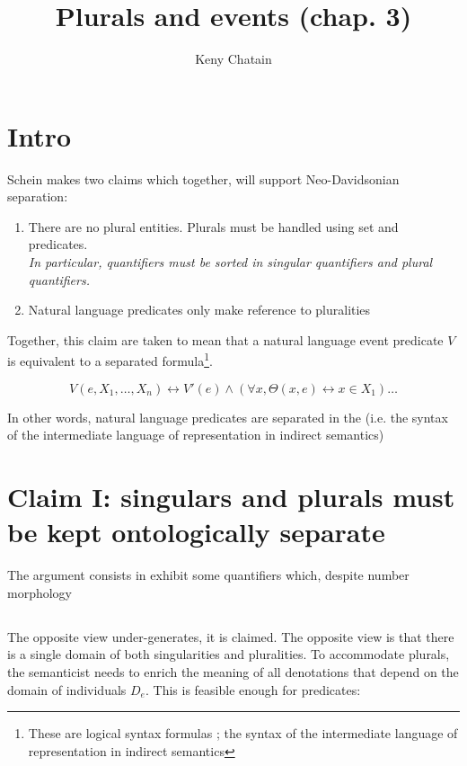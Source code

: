 \documentclass[english]{article}
\title{Plurals and events (chap. 3)}
\author{Keny Chatain}
\begin{document}
\maketitle

\section*{Intro}
Schein makes two claims which together, will support Neo-Davidsonian separation:

\begin{enumerate}
\item There are no plural entities. Plurals must be handled using set and predicates.\\
\emph{In particular, quantifiers must be sorted in singular quantifiers and plural quantifiers.}
\item Natural language predicates only make reference to pluralities
\end{enumerate}
%
Together, this claim are taken to mean that a natural language event predicate $V$ is equivalent to a separated formula\footnote{These are logical syntax formulas ; the syntax of the intermediate language of representation in indirect semantics}. 

$$V(e, X_1, \ldots, X_n) \leftrightarrow V'(e) \wedge \left( \forall x, \Theta(x, e) \leftrightarrow x\in X_1\right) \ldots $$

In other words, natural language predicates are separated in the  (i.e. the syntax of the intermediate language of representation in indirect semantics)

\section*{Claim I: singulars and plurals must be kept ontologically separate}

The argument consists in exhibit some quantifiers which, despite number morphology

\subsection{}


The opposite view under-generates, it is claimed. The opposite view is that there is a single domain of both singularities and pluralities. To accommodate plurals, the semanticist needs to enrich the meaning of all denotations that depend on the domain of individuals $D_e$. This is feasible enough for predicates:
\end{document}
